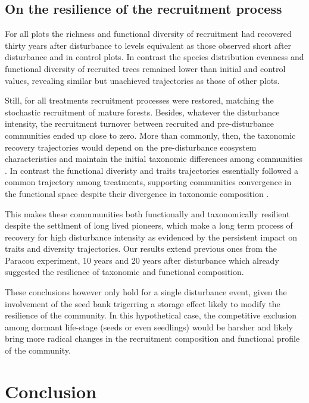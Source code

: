 \documentclass[fleqn,10pt]{ArtEcoFoG} %
\begin{document}
\subsection{On the resilience of the recruitment
process}\label{on-the-resilience-of-the-recruitment-process}

For all plots the richness and functional diversity of recruitment had
recovered thirty years after disturbance to levels equivalent as those
observed short after disturbance and in control plots. In contrast the
species distribution evenness and functional diversity of recruited
trees remained lower than initial and control values, revealing similar
but unachieved trajectories as those of other plots.

Still, for all treatments recruitment processes were restored, matching
the stochastic recruitment of mature forests. Besides, whatever the
disturbance intensity, the recruitment turnover between recruited and
pre-disturbance communities ended up close to zero. More than commonly,
then, the taxonomic recovery trajectories would depend on the
pre-disturbance ecosystem characteristics and maintain the initial
taxonomic differences among communities
\citep{Anderson2007, Herault2018}. In contrast the functional diveristy
and traits trajectories essentially followed a common trajectory among
treatments, supporting communities convergence in the functional space
despite their divergence in taxonomic composition \citep{Fukami2005}.

This makes these commmunities both functionally and taxonomically
resilient despite the settlment of long lived pioneers, which make a
long term process of recovery for high disturbance intensity as
evidenced by the persistent impact on traits and diversity trajectories.
Our results extend previous ones from the Paracou experiment, 10 years
\citep{Molino2001} and 20 years \citep{Baraloto2012a} after disturbance
which already suggested the resilience of taxonomic and functional
composition.

These conclusions however only hold for a single disturbance event,
given the involvement of the seed bank trigerring a storage effect
likely to modify the resilience of the community. In this hypothetical
case, the competitive exclusion among dormant life-stage (seeds or even
seedlings) would be harsher and likely bring more radical changes in the
recruitment composition and functional profile of the community.

\section{Conclusion}\label{conclusion}
\end{document}
